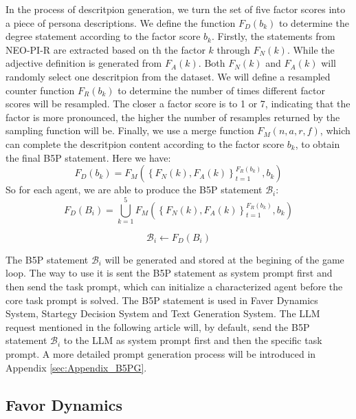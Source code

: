 In the process of descritpion generation, we turn the set of five factor scores into a piece of persona descriptions. We define the function $ F_D(b_k) $ to determine the degree statement according to the factor score $ b_k $. Firstly, the statements from NEO-PI-R are extracted based on th the factor $ k $ through $ F_N(k) $. While the adjective definition is generated from $ F_A(k) $. Both $ F_N(k) $ and $ F_A(k) $ will randomly select one descritpion from the dataset. We will define a resampled counter function $ F_R(b_k) $ to determine the number of times different factor scores will be resampled. The closer a factor score is to 1 or 7, indicating that the factor is more pronounced, the higher the number of resamples returned by the sampling function will be. Finally, we use a merge function $ F_M(n, a, r, f) $, which can complete the descritpion content according to the factor score $ b_k $, to obtain the final B5P statement. Here we have:
\begin{equation}
  F_D(b_k) = F_M( {\left\{ F_N(k), F_A(k) \right\}}_{t=1}^{F_R(b_k)}, b_k)
\end{equation}
So for each agent, we are able to produce the B5P statement $ \mathcal{B}_i $:
\begin{equation}
   F_D(B_i) = \bigcup_{k=1}^{5} F_M( {\left\{ F_N(k), F_A(k) \right\}}_{t=1}^{F_R(b_k)}, b_k)
\end{equation}

\begin{equation}
  \mathcal{B}_i \leftarrow F_D(B_i)
\end{equation}

The B5P statement $ \mathcal{B}_i $ will be generated and stored at the begining of the game loop. The way to use it is sent the B5P statement as system prompt first and then send the task prompt, which can initialize a characterized agent before the core task prompt is solved. The B5P statement is used in Faver Dynamics System, Startegy Decision System and Text Generation System. The LLM request mentioned in the following article will, by default, send the B5P statement $ \mathcal{B}_i $ to the LLM as system prompt first and then the specific task prompt. A more detailed prompt generation process will be introduced in Appendix \ref{sec:Appendix_B5PG}.

\subsection{Favor Dynamics}
\label{sec:FavorDynamics}

